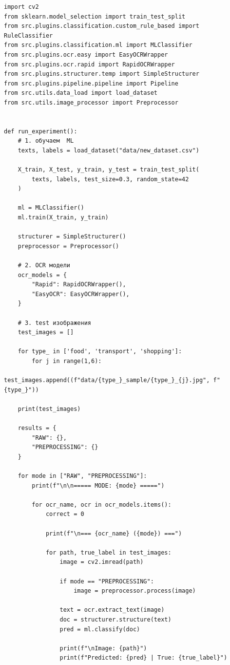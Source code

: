 \documentclass[14pt,a4paper]{extarticle}
\newcommand{\structsection}[1]{
  \addcontentsline{toc}{section}{\MakeUppercase{#1}}
  \clearpage
  \noindent{\centering\textbf{\MakeUppercase{#1}}\par}
}
\begin{document}
\appendix
\structsection{Приложение}
\begin{lstlisting}
import cv2
from sklearn.model_selection import train_test_split
from src.plugins.classification.custom_rule_based import RuleClassifier
from src.plugins.classification.ml import MLClassifier
from src.plugins.ocr.easy import EasyOCRWrapper
from src.plugins.ocr.rapid import RapidOCRWrapper
from src.plugins.structurer.temp import SimpleStructurer
from src.plugins.pipeline.pipeline import Pipeline
from src.utils.data_load import load_dataset
from src.utils.image_processor import Preprocessor


def run_experiment():
    # 1. обучаем  ML
    texts, labels = load_dataset("data/new_dataset.csv")

    X_train, X_test, y_train, y_test = train_test_split(
        texts, labels, test_size=0.3, random_state=42
    )

    ml = MLClassifier()
    ml.train(X_train, y_train)

    structurer = SimpleStructurer()
    preprocessor = Preprocessor()

    # 2. OCR модели
    ocr_models = {
        "Rapid": RapidOCRWrapper(),
        "EasyOCR": EasyOCRWrapper(),
    }

    # 3. test изображения
    test_images = []

    for type_ in ['food', 'transport', 'shopping']:
        for j in range(1,6):
            test_images.append((f"data/{type_}_sample/{type_}_{j}.jpg", f"{type_}"))

    print(test_images)

    results = {
        "RAW": {},
        "PREPROCESSING": {}
    }

    for mode in ["RAW", "PREPROCESSING"]:
        print(f"\n\n===== MODE: {mode} =====")

        for ocr_name, ocr in ocr_models.items():
            correct = 0

            print(f"\n=== {ocr_name} ({mode}) ===")

            for path, true_label in test_images:
                image = cv2.imread(path)

                if mode == "PREPROCESSING":
                    image = preprocessor.process(image)

                text = ocr.extract_text(image)
                doc = structurer.structure(text)
                pred = ml.classify(doc)

                print(f"\nImage: {path}")
                print(f"Predicted: {pred} | True: {true_label}")


\end{lstlisting}
\end{document}
